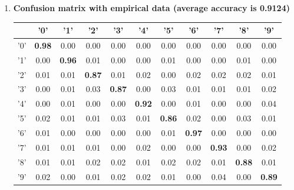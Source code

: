 \documentclass[12pt]{article}
\begin{document}
\begin{enumerate}
	\item {\bf Confusion matrix with empirical data (average accuracy is 0.9124)}
	\begin{center}
	\begin{tabular}{|c|c|c|c|c|c|c|c|c|c|c|}
		\hline
		\diaghead{\theadfont Diag ColumnmnHead II}{truth}{result} 
		& '0' & '1' & '2' & '3' & '4' & '5' & '6' & '7' & '8' & '9' \\
		\hline
		'0' & {\bf 0.98} & 0.00 & 0.00 & 0.00 & 0.00 & 0.00 & 0.00 & 0.00 & 0.00 & 0.00 \\ 
 		\hline 
		'1' & 0.00 & {\bf 0.96} & 0.01 & 0.00 & 0.00 & 0.01 & 0.00 & 0.00 & 0.01 & 0.00 \\ 
 		\hline 
		'2' & 0.01 & 0.01 & {\bf 0.87} & 0.01 & 0.02 & 0.00 & 0.02 & 0.02 & 0.02 & 0.01 \\ 
 		\hline 
		'3' & 0.00 & 0.01 & 0.03 & {\bf 0.87} & 0.00 & 0.03 & 0.01 & 0.01 & 0.01 & 0.02 \\ 
 		\hline 
		'4' & 0.00 & 0.01 & 0.00 & 0.00 & {\bf 0.92} & 0.00 & 0.01 & 0.00 & 0.00 & 0.04 \\ 
 		\hline 
		'5' & 0.02 & 0.01 & 0.01 & 0.03 & 0.01 & {\bf 0.86} & 0.02 & 0.00 & 0.03 & 0.01 \\ 
 		\hline 
		'6' & 0.01 & 0.00 & 0.00 & 0.00 & 0.00 & 0.01 & {\bf 0.97} & 0.00 & 0.00 & 0.00 \\ 
 		\hline 
		'7' & 0.01 & 0.01 & 0.01 & 0.00 & 0.02 & 0.00 & 0.00 & {\bf 0.93} & 0.00 & 0.02 \\ 
 		\hline 
		'8' & 0.01 & 0.01 & 0.02 & 0.02 & 0.01 & 0.02 & 0.02 & 0.01 & {\bf 0.88} & 0.01 \\ 
 		\hline 
		'9' & 0.02 & 0.00 & 0.01 & 0.02 & 0.02 & 0.01 & 0.00 & 0.04 & 0.00 & {\bf 0.89 } \\ 
 		\hline 
	\end{tabular}
	\end{center}
	

\end{enumerate}
\end{document}
